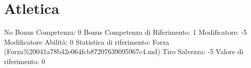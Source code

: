 \section{Atletica}\label{atletica}

\begin{description}
\tightlist
\item[Tags: ABI]
No Bonus Competenza: 0 Bonus Competenza di Riferimento: 1 Modificatore:
-5 Modificatore Abilità: 0 Statistica di riferimento: Forza
(Forza\%20041a78b42e064fcb87207639095967c4.md) Tiro Salvezza: -5 Valore
di riferimento: 0
\end{description}
